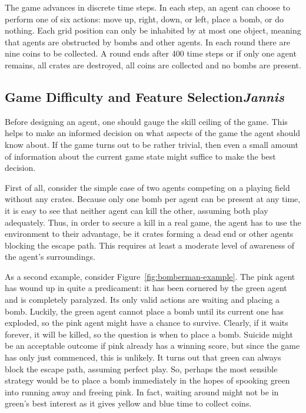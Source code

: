 \documentclass{article}
\begin{document}
The game advances in discrete time steps. In each step, an agent can choose to perform one of six actions: move up, right, down, or left, place a bomb, or do nothing. Each grid position can only be inhabited by at most one object, meaning that agents are obstructed by bombs and other agents. In each round there are nine coins to be collected. A round ends after 400 time steps or if only one agent remains, all crates are destroyed, all coins are collected and no bombs are present.

\subsection[Game Difficulty and Feature Selection]{{Game Difficulty and Feature Selection}\normalsize \normalfont \it \hfill Jannis}

Before designing an agent, one should gauge the skill ceiling of the game. This helps to make an informed decision on what aspects of the game the agent should know about. If the game turns out to be rather trivial, then even a small amount of information about the current game state might suffice to make the best decision.

\clearpage

First of all, consider the simple case of two agents competing on a playing field without any crates. Because only one bomb per agent can be present at any time, it is easy to see that neither agent can kill the other, assuming both play adequately. Thus, in order to secure a kill in a real game, the agent has to use the environment to their advantage, be it crates forming a dead end or other agents blocking the escape path. This requires at least a moderate level of awareness of the agent's surroundings.\par

As a second example, consider Figure~\ref{fig:bomberman-example}. The pink agent has wound up in quite a predicament: it has been cornered by the green agent and is completely paralyzed. Its only valid actions are waiting and placing a bomb. Luckily, the green agent cannot place a bomb until its current one has exploded, so the pink agent might have a chance to survive. Clearly, if it waits forever, it will be killed, so the question is when to place a bomb. Suicide might be an acceptable outcome if pink already has a winning score, but since the game has only just commenced, this is unlikely. It turns out that green can always block the escape path, assuming perfect play. So, perhaps the most sensible strategy would be to place a bomb immediately in the hopes of spooking green into running away and freeing pink. In fact, waiting around might not be in green's best interest as it gives yellow and blue time to collect coins.\par
\end{document}
